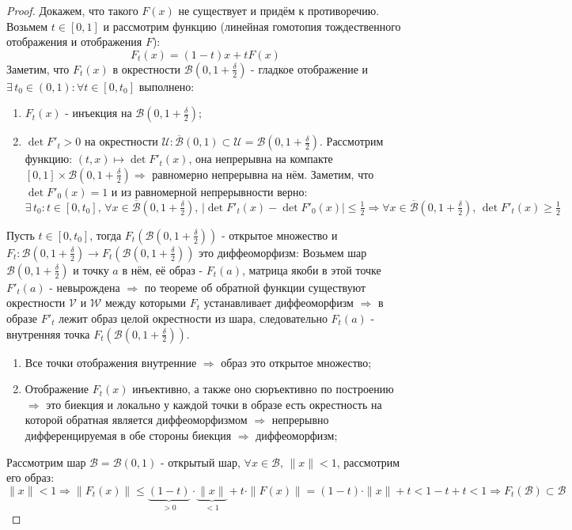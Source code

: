 \documentclass[12pt]{article}
\newcommand{\MU}{\mathcal{U}}
\newcommand{\MV}{\mathcal{V}}
\newcommand{\MB}{\mathcal{B}}
\newcommand{\MW}{\mathcal{W}}
\theoremstyle{definition}
\newcommand{\ovl}[1]{\overline{#1}}
\begin{document}
\begin{proof}
	Докажем, что такого $F(x)$ не существует и придём к противоречию. Возьмем $t \in [0,1]$ и рассмотрим функцию (линейная гомотопия тождественного отображения и отображения $F$):
	$$
		F_t(x) = (1 - t)x + tF(x)
	$$
	Заметим, что $F_t(x)$ в окрестности $\MB(0,1 + \tfrac{\delta}{2})$ - гладкое отображение и $\exists \, t_0 \in (0,1) \colon \forall t \in[0,t_0]$ выполнено:
	\begin{enumerate}[label=\arabic*)]
		\item $F_t(x)$ - инъекция на $\MB(0,1 + \tfrac{\delta}{2})$;
		\item $\det{F'_t} > 0$ на окрестности $\MU \colon \ovl{\MB}(0,1) \subset \MU = \MB(0,1 + \tfrac{\delta}{2})$. Рассмотрим функцию: $(t,x) \mapsto \det{F'_t(x)}$, она непрерывна на компакте $[0,1] \times \MB(0,1 + \tfrac{\delta}{2}) \Rightarrow$ равномерно непрерывна на нём. Заметим, что $\det{F'_0(x)} = 1$ и из равномерной непрерывности верно:
		$$
			\exists \, t_0 \colon t \in [0, t_0], \, \forall x \in \ovl{\MB}(0, 1 + \tfrac{\delta}{2}), \,  |\det{F'_t(x)} - \det{F'_0(x)}| \leq \tfrac{1}{2} \Rightarrow  \forall x \in \ovl{\MB}(0, 1 + \tfrac{\delta}{2}), \, \det{F'_t(x)} \geq \tfrac{1}{2}
		$$
	\end{enumerate}
	Пусть $t \in [0, t_0]$, тогда $F_t(\MB(0,1 + \tfrac{\delta}{2}))$ - открытое множество и $F_t \colon \MB(0, 1 + \tfrac{\delta}{2}) \to F_t(\MB(0,1 + \tfrac{\delta}{2}))$ это диффеоморфизм: Возьмем шар $\MB(0, 1 + \tfrac{\delta}{2})$ и точку $a$ в нём, её образ - $F_t(a)$, матрица якоби в этой точке $F'_t(a)$ - невырождена $\Rightarrow$ по теореме об обратной функции существуют окрестности $\MV$ и $\MW$ между которыми $F_t$ устанавливает диффеоморфизм $\Rightarrow$ в образе $F'_t$ лежит образ целой окрестности из шара, следовательно $F_t(a)$ - внутренняя точка $F_t(\MB(0, 1 + \tfrac{\delta}{2}))$.
	\begin{enumerate}[label=\arabic*)]
		\item Все точки отображения внутренние $\Rightarrow$ образ это открытое множество;
		\item Отображение $F_t(x)$ инъективно, а также оно сюръективно по построению $\Rightarrow$ это биекция и локально у каждой точки в образе есть окрестность на которой обратная является диффеоморфизмом $\Rightarrow$ непрерывно дифференцируемая в обе стороны биекция $\Rightarrow$ диффеоморфизм;
	\end{enumerate}
	 Рассмотрим шар $\MB = \MB(0,1)$ - открытый шар, $\forall x \in \MB, \, \|x\| < 1$, рассмотрим его образ:
	 $$
	 	\|x\| < 1 \Rightarrow \|F_t(x)\| \leq \underbrace{(1 -t)}_{>0}{\cdot}\underbrace{\|x\|}_{< 1} + t{\cdot}\|F(x)\| = (1 - t){\cdot}\|x\| + t  < 1 - t + t < 1 \Rightarrow F_t(\MB) \subset \MB
$$
\end{proof}
\end{document}

